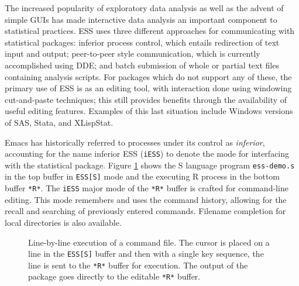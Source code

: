 \documentclass{article}
\newcommand{\stexttt}[1]{{\small\texttt{#1}}}
\begin{document}
The increased popularity of exploratory data analysis as well as the
advent of simple GUIs has made interactive data analysis an important
component to statistical practices.  ESS uses three different
approaches for communicating with statistical packages: inferior
process control, which entails redirection of text input and output;
peer-to-peer style communication, which is currently accomplished
using DDE; and batch submission of whole or partial text files
containing analysis scripts.  For packages which do not support any of
these, the primary use of ESS is as an editing tool, with interaction
done using windowing cut-and-paste techniques; this still provides
benefits through the availability of useful editing features.
Examples of this last situation include Windows versions of SAS, Stata, and
XLispStat.

Emacs has historically referred to processes under its control as
\textit{inferior}, accounting for the name inferior ESS
(\stexttt{iESS}) to denote the mode for interfacing with the
statistical package.  Figure \ref{f.ess-demo} shows the S language
program \stexttt{ess-demo.s} in the top buffer in \stexttt{ESS[S]}
mode and the executing R process in the bottom buffer \stexttt{*R*}.
The \stexttt{iESS} major mode of the \stexttt{*R*} buffer is crafted
for command-line editing.  This mode remembers and uses the command
history, allowing for the recall and searching of previously entered
commands.  Filename completion for local directories is also
available.


\begin{figure}[tb]
  \caption{Line-by-line execution of a command file. The cursor is
    placed on a line in the \stexttt{ESS[S]} buffer and then with a
    single key sequence, the line is sent to the \stexttt{*R*} buffer
    for execution.  The output of the package goes directly to the
    editable \stexttt{*R*} buffer.}
  \label{f.ess-demo}
\end{figure}
\end{document}
